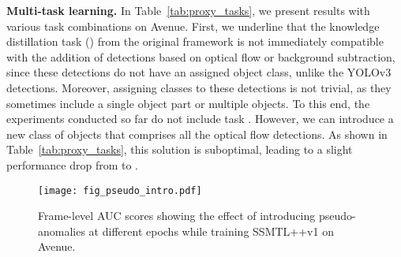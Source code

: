 \documentclass[times,twocolumn,final,authoryear]{elsarticle}
\begin{document}
\noindent
{\bf Multi-task learning.}
In Table~\ref{tab:proxy_tasks}, we present results with various task combinations on Avenue. First, we underline that the knowledge distillation task () from the original framework is not immediately compatible with the addition of detections based on optical flow or background subtraction, since these detections do not have an assigned object class, unlike the YOLOv3 detections. Moreover, assigning classes to these detections is not trivial, as they sometimes include a single object part or multiple objects. To this end, the experiments conducted so far do not include task . However, we can introduce a new class of objects that comprises all the optical flow detections. As shown in Table~\ref{tab:proxy_tasks}, this solution is suboptimal, leading to a slight performance drop from  to . 

\begin{figure}[t]
\begin{center}
\texttt{[image: fig\_pseudo\_intro.pdf]}
\end{center}
\vspace{-0.4cm}
   \caption{Frame-level AUC scores showing the effect of introducing pseudo-anomalies at different epochs while training SSMTL++v1 on Avenue.}
\label{fig:epochs}
\end{figure}
\end{document}
